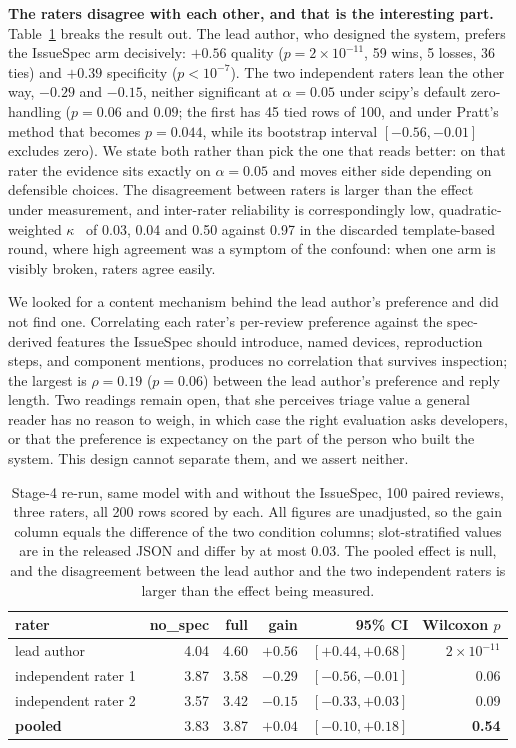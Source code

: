 \documentclass[preprint,12pt]{elsarticle}
\begin{document}
\textbf{The raters disagree with each other, and that is the interesting part.}
Table~\ref{tab:stage4-rerun} breaks the result out. The lead author, who designed the system,
prefers the IssueSpec arm decisively: $+0.56$ quality ($p = 2 \times 10^{-11}$, 59 wins, 5 losses,
36 ties) and $+0.39$ specificity ($p < 10^{-7}$). The two independent raters lean the other way,
$-0.29$ and $-0.15$, neither significant at $\alpha = 0.05$ under scipy's default zero-handling
($p = 0.06$ and $0.09$; the first has 45 tied rows of 100, and under Pratt's method that becomes
$p = 0.044$, while its bootstrap interval $[-0.56, -0.01]$ excludes zero). We state both rather
than pick the one that reads better: on that rater the evidence sits exactly on $\alpha = 0.05$
and moves either side depending on defensible choices. The disagreement between raters is larger
than the effect under measurement, and inter-rater reliability is correspondingly low,
quadratic-weighted $\kappa$~\cite{cohen1968weighted} of 0.03, 0.04 and 0.50 against 0.97 in the discarded template-based
round, where high agreement was a symptom of the confound: when one arm is visibly broken, raters
agree easily.

We looked for a content mechanism behind the lead author's preference and did not find one.
Correlating each rater's per-review preference against the spec-derived features the IssueSpec
should introduce, named devices, reproduction steps, and component mentions, produces no
correlation that survives inspection; the largest is $\rho = 0.19$ ($p = 0.06$) between the lead
author's preference and reply length. Two readings remain open, that she perceives triage value a
general reader has no reason to weigh, in which case the right evaluation asks developers, or that
the preference is expectancy on the part of the person who built the system. This design cannot
separate them, and we assert neither.

\begin{table}[t]\centering\footnotesize

\begin{tabular}{@{}lrrrrr@{}}\toprule
rater & no\_spec & full & gain & 95\% CI & Wilcoxon $p$ \\\midrule
lead author & 4.04 & 4.60 & $+0.56$ & $[+0.44, +0.68]$ & $2 \times 10^{-11}$ \\
independent rater 1 & 3.87 & 3.58 & $-0.29$ & $[-0.56, -0.01]$ & 0.06 \\
independent rater 2 & 3.57 & 3.42 & $-0.15$ & $[-0.33, +0.03]$ & 0.09 \\\midrule
\textbf{pooled} & 3.83 & 3.87 & $\mathbf{+0.04}$ & $[-0.10, +0.18]$ & \textbf{0.54} \\
\bottomrule\end{tabular}
\caption{Stage-4 re-run, same model with and without the IssueSpec, 100 paired reviews, three
raters, all 200 rows scored by each. All figures are unadjusted, so the gain column equals the difference of the two condition
columns; slot-stratified values are in the released JSON and differ by at most 0.03. The pooled
effect is null, and the disagreement between the lead author and the two independent raters is
larger than the effect being measured.}\label{tab:stage4-rerun}\end{table}
\end{document}
